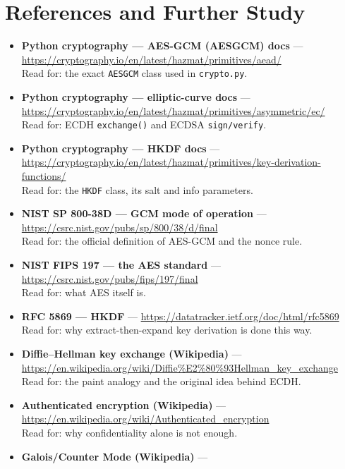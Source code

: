 \documentclass[11pt,a4paper]{article}
\begin{document}
\section{References and Further Study}
\begin{itemize}
  \item \textbf{Python cryptography --- AES-GCM (AESGCM) docs} ---
        \url{https://cryptography.io/en/latest/hazmat/primitives/aead/}\\
        Read for: the exact \texttt{AESGCM} class used in \texttt{crypto.py}.
  \item \textbf{Python cryptography --- elliptic-curve docs} ---
        \url{https://cryptography.io/en/latest/hazmat/primitives/asymmetric/ec/}\\
        Read for: ECDH \texttt{exchange()} and ECDSA \texttt{sign/verify}.
  \item \textbf{Python cryptography --- HKDF docs} ---
        \url{https://cryptography.io/en/latest/hazmat/primitives/key-derivation-functions/}\\
        Read for: the \texttt{HKDF} class, its salt and info parameters.
  \item \textbf{NIST SP 800-38D --- GCM mode of operation} ---
        \url{https://csrc.nist.gov/pubs/sp/800/38/d/final}\\
        Read for: the official definition of AES-GCM and the nonce rule.
  \item \textbf{NIST FIPS 197 --- the AES standard} ---
        \url{https://csrc.nist.gov/pubs/fips/197/final}\\
        Read for: what AES itself is.
  \item \textbf{RFC 5869 --- HKDF} ---
        \url{https://datatracker.ietf.org/doc/html/rfc5869}\\
        Read for: why extract-then-expand key derivation is done this way.
  \item \textbf{Diffie--Hellman key exchange (Wikipedia)} ---
        \url{https://en.wikipedia.org/wiki/Diffie%E2%80%93Hellman_key_exchange}\\
        Read for: the paint analogy and the original idea behind ECDH.
  \item \textbf{Authenticated encryption (Wikipedia)} ---
        \url{https://en.wikipedia.org/wiki/Authenticated_encryption}\\
        Read for: why confidentiality alone is not enough.
  \item \textbf{Galois/Counter Mode (Wikipedia)} ---

\end{itemize}
\end{document}
